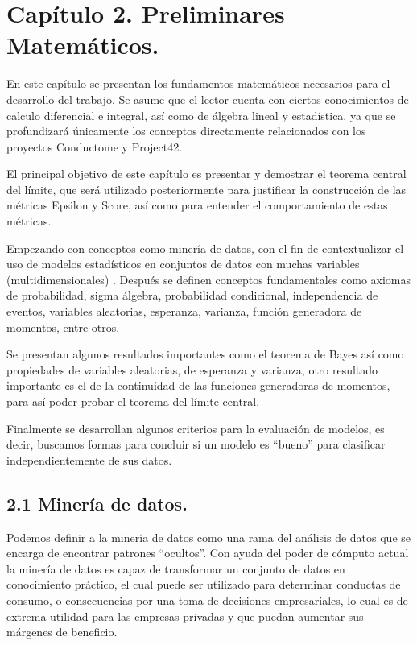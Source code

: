 \documentclass[
 12pt,
 letterpaper,
]{article}
\theoremstyle{teoremaBreak}
\theoremstyle{plain}
\theoremstyle{definition}
\begin{document}
\section{Capítulo 2. Preliminares
Matemáticos.}\label{capuxedtulo-2.-preliminares-matemuxe1ticos.}

En este capítulo se presentan los fundamentos matemáticos necesarios
para el desarrollo del trabajo. Se asume que el lector cuenta con
ciertos conocimientos de calculo diferencial e integral, así como 
de álgebra lineal y estadística, ya que se profundizará únicamente los conceptos directamente
relacionados con los proyectos Conductome y Project42.

El principal objetivo de este capítulo es presentar y demostrar el teorema central 
del límite, que será utilizado posteriormente para justificar la construcción de las 
métricas Epsilon y Score, así como para entender el comportamiento de estas métricas.

Empezando con conceptos como minería de datos, con el fin de
contextualizar el uso de modelos estadísticos en conjuntos de datos con
muchas variables (multidimensionales) . Después se definen conceptos fundamentales 
como axiomas de probabilidad, sigma álgebra, probabilidad condicional, independencia de eventos, 
variables aleatorias, esperanza, varianza, función generadora de momentos, entre otros.

Se presentan algunos resultados importantes como el teorema de Bayes así como 
propiedades de variables aleatorias, de esperanza y varianza, otro resultado importante es el de 
la continuidad de las funciones generadoras de momentos, para así poder probar el teorema del límite central.

Finalmente se desarrollan algunos criterios para la evaluación de
modelos, es decir, buscamos formas para concluir si un modelo es
``bueno'' para clasificar independientemente de sus datos.

\subsection{2.1 Minería de datos.}\label{mineruxeda-de-datos.}

Podemos definir a la minería de datos como una rama del análisis de
datos que se encarga de encontrar patrones ``ocultos''. Con ayuda del
poder de cómputo actual la minería de datos es capaz de transformar un
conjunto de datos en conocimiento práctico, el cual puede ser utilizado
para determinar conductas de consumo, o consecuencias por una toma de
decisiones empresariales, lo cual es de extrema utilidad para las
empresas privadas y que puedan aumentar sus márgenes de beneficio.
\end{document}
